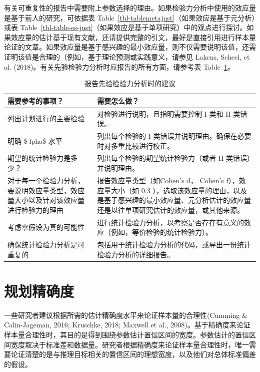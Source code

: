 \documentclass[
  letterpaper,
  DIV=11,
  numbers=noendperiod]{scrreprt}
\begin{document}
有关可重复性的报告中需要附上参数选择的理由。如果检验力分析中使用的效应量是基于前人的研究，可依据表
Table~\ref{tbl-tablemetajust}（如果效应是基于元分析）或表
Table~\ref{tbl-table-es-just}（如果效应是基于单项研究）中的观点进行探讨。如果效应量的估计基于现有文献，还请提供完整的引文，最好是直接引用进行样本量论证的文章。如果效应量是基于感兴趣的最小效应量，则不仅需要说明该值，还需证明该值是合理的（例如，基于理论预测或实践意义，请参见
Lakens, Scheel, et al.
(2018)。有关先验检验力分析时应报告的所有方面，请参考表
Table~\ref{tbl-table-pow-rec-2}。

\hypertarget{tbl-table-pow-rec-2}{}
\begin{table}
\caption{\label{tbl-table-pow-rec-2}报告先验检验力分析时的建议 }\tabularnewline

\centering
\begin{tabular}{>{\raggedright\arraybackslash}p{5cm}|>{\raggedright\arraybackslash}p{10cm}}
\hline
需要参考的事项？ & 需要怎么做？\\
\hline
列出计划进行的主要检验 & 对检验进行说明，且指明需要控制 I 类和 II 类错误。\\
\hline
明确 \$lpha\$ 水平 & 列出每个检验的 I 类错误并说明理由。确保在必要时对多重比较进行校正。\\
\hline
期望的统计检验力是多少？ & 列出每个检验的期望统计检验力（或者 II 类错误）并说明理由。\\
\hline
对于每一个检验力分析，要说明效应量类型，效应量大小以及针对该效应量进行检验力的理由 & 报告效应量类型（如Cohen's d， Cohen's f），效应量大小（如 0.3 ），选取该效应量的理由，以及是基于感兴趣的最小效应量、元分析估计的效应量还是以往单项研究估计的效应量，或其他来源。\\
\hline
考虑零假设为真的可能性 & 进行统计检验力分析，以考察是否存在有意义的效应（例如，等价检验的统计检验力）。\\
\hline
确保统计检验力分析是可重复的 & 包括用于统计检验力分析的代码，或导出一份统计检验力分析的详细报告。\\
\hline
\end{tabular}
\end{table}

\hypertarget{planprecision}{%
\section{规划精确度}\label{planprecision}}

一些研究者建议根据所需的估计精确度水平来论证样本量的合理性(Cumming \&
Calin-Jageman, 2016; Kruschke, 2018; Maxwell et al.,
2008)。基于精确度来论证样本量合理性时，其目的是得到围绕参数估计置信区间的宽度。参数估计的置信区间宽度取决于标准差和数据量。研究者根据精确度来论证样本量合理性时，唯一需要论证清楚的是与推理目标相关的置信区间的理想宽度，以及他们对总体标准偏差的假设。
\end{document}
